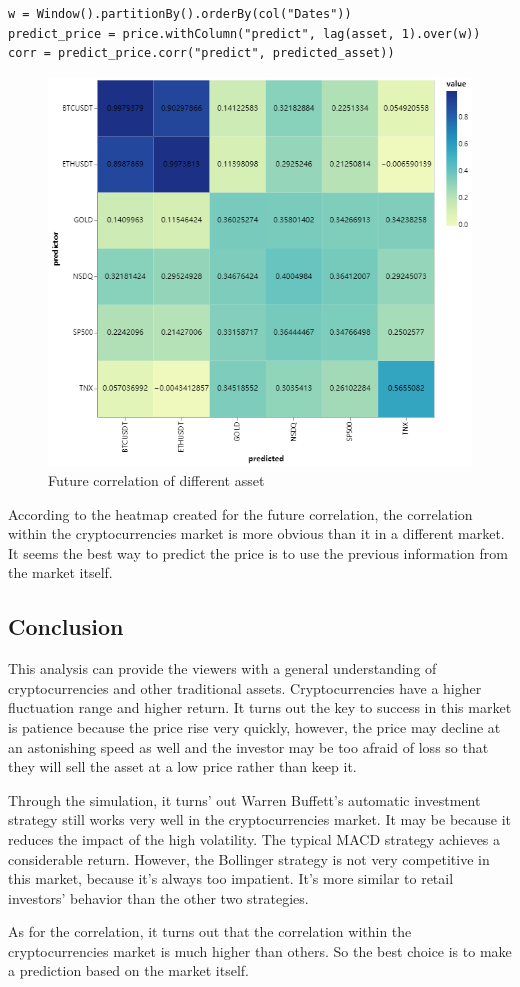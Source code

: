\documentclass[a4paper]{article}
\begin{document}
\begin{verbatim}
w = Window().partitionBy().orderBy(col("Dates"))
predict_price = price.withColumn("predict", lag(asset, 1).over(w))
corr = predict_price.corr("predict", predicted_asset))
\end{verbatim}
\begin{figure}[H]
    \centering
    \includegraphics[scale=0.4]{Q7.png}
    \caption{Future correlation of different asset}
\end{figure}
According to the heatmap created for the future correlation, the correlation within the cryptocurrencies market is more obvious than it in a different market. It seems the best way to predict the price is to use the previous information from the market itself.
\subsection{Conclusion}
This analysis can provide the viewers with a general understanding of cryptocurrencies and other traditional assets. Cryptocurrencies have a higher fluctuation range and higher return. It turns out the key to success in this market is patience because the price rise very quickly, however, the price may decline at an astonishing speed as well and the investor may be too afraid of loss so that they will sell the asset at a low price rather than keep it.
\par Through the simulation, it turns' out Warren Buffett's automatic investment strategy still works very well in the cryptocurrencies market. It may be because it reduces the impact of the high volatility. The typical MACD strategy achieves a considerable return. However, the Bollinger strategy is not very competitive in this market, because it's always too impatient. It's more similar to retail investors' behavior than the other two strategies.
\par As for the correlation, it turns out that the correlation within the cryptocurrencies market is much higher than others. So the best choice is to make a prediction based on the market itself.
\end{document}
